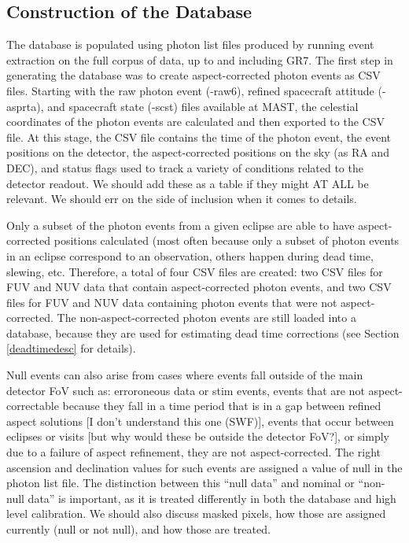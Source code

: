 \documentclass[5p]{elsarticle}
\begin{document}
\subsection{Construction of the Database}
The database is populated using photon list files produced by running event extraction on the full corpus of data, up to and including GR7.  The first step in generating the database was to create aspect-corrected photon events as CSV files.  Starting with the raw photon event (-raw6), refined spacecraft attitude (-asprta), and spacecraft state (-scst) files available at MAST, the celestial coordinates of the photon events are calculated and then exported to the CSV file.  At this stage, the CSV file contains the time of the photon event, the event positions on the detector, the aspect-corrected positions on the sky (as RA and DEC), and status flags used to track a variety of conditions related to the detector readout. {\color{red}We should add these as a table if they might AT ALL be relevant.  We should err on the side of inclusion when it comes to details.}

Only a subset of the photon events from a given eclipse are able to have aspect-corrected positions calculated (most often because only a subset of photon events in an eclipse correspond to an observation, others happen during dead time, slewing, etc.  Therefore, a total of four CSV files are created: two CSV files for FUV and NUV data that contain aspect-corrected photon events, and two CSV files for FUV and NUV data containing photon events that were not aspect-corrected.  The non-aspect-corrected photon events are still loaded into a database, because they are used for estimating dead time corrections (see Section \ref{deadtimedesc} for details).

Null events can also arise from cases where events fall outside of the main detector FoV such as: erroroneous data or stim events, {\color{red}events that are not aspect-correctable because they fall in a time period that is in a gap between refined aspect solutions [I don't understand this one (SWF)]}, events that occur between eclipses or visits {\color{red}[but why would these be outside the detector FoV?]}, or simply due to a failure of aspect refinement, they are not aspect-corrected. The right ascension and declination values for such events are assigned a value of null in the photon list file. The distinction between this ``null data'' and nominal or ``non-null data'' is important, as it is treated differently in both the database and high level calibration.  {\color{red}We should also discuss masked pixels, how those are assigned currently (null or not null), and how those are treated.}
\end{document}
